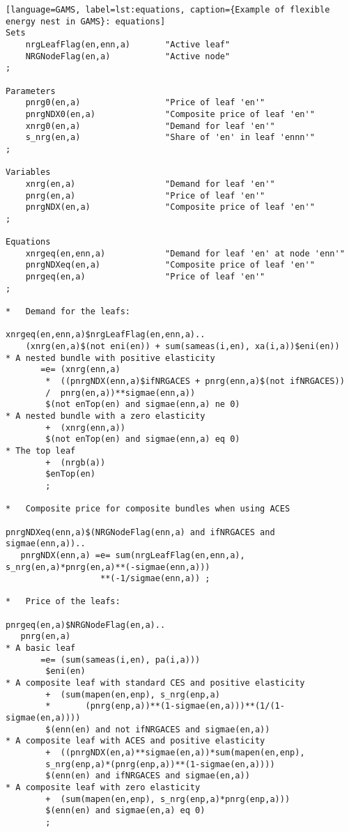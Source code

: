 \begin{lstlisting}[language=GAMS, label=lst:equations, caption={Example of flexible energy nest in GAMS}: equations]
Sets
    nrgLeafFlag(en,enn,a)       "Active leaf"
    NRGNodeFlag(en,a)           "Active node"
;

Parameters
    pnrg0(en,a)                 "Price of leaf 'en'"
    pnrgNDX0(en,a)              "Composite price of leaf 'en'"
    xnrg0(en,a)                 "Demand for leaf 'en'"
    s_nrg(en,a)                 "Share of 'en' in leaf 'ennn'"
;

Variables
    xnrg(en,a)                  "Demand for leaf 'en'"
    pnrg(en,a)                  "Price of leaf 'en'"
    pnrgNDX(en,a)               "Composite price of leaf 'en'"
;

Equations
    xnrgeq(en,enn,a)            "Demand for leaf 'en' at node 'enn'"
    pnrgNDXeq(en,a)             "Composite price of leaf 'en'"
    pnrgeq(en,a)                "Price of leaf 'en'"
;

*   Demand for the leafs:

xnrgeq(en,enn,a)$nrgLeafFlag(en,enn,a)..
    (xnrg(en,a)$(not eni(en)) + sum(sameas(i,en), xa(i,a))$eni(en))
* A nested bundle with positive elasticity
       =e= (xnrg(enn,a)
        *  ((pnrgNDX(enn,a)$ifNRGACES + pnrg(enn,a)$(not ifNRGACES))
        /  pnrg(en,a))**sigmae(enn,a))
        $(not enTop(en) and sigmae(enn,a) ne 0)
* A nested bundle with a zero elasticity
        +  (xnrg(enn,a))
        $(not enTop(en) and sigmae(enn,a) eq 0)
* The top leaf
        +  (nrgb(a))
        $enTop(en)
        ;

*   Composite price for composite bundles when using ACES

pnrgNDXeq(enn,a)$(NRGNodeFlag(enn,a) and ifNRGACES and sigmae(enn,a))..
   pnrgNDX(enn,a) =e= sum(nrgLeafFlag(en,enn,a), s_nrg(en,a)*pnrg(en,a)**(-sigmae(enn,a)))
                   **(-1/sigmae(enn,a)) ;

*   Price of the leafs:

pnrgeq(en,a)$NRGNodeFlag(en,a)..
   pnrg(en,a)
* A basic leaf
       =e= (sum(sameas(i,en), pa(i,a)))
        $eni(en)
* A composite leaf with standard CES and positive elasticity
        +  (sum(mapen(en,enp), s_nrg(enp,a)
        *       (pnrg(enp,a))**(1-sigmae(en,a)))**(1/(1-sigmae(en,a))))
        $(enn(en) and not ifNRGACES and sigmae(en,a))
* A composite leaf with ACES and positive elasticity
        +  ((pnrgNDX(en,a)**sigmae(en,a))*sum(mapen(en,enp),
        s_nrg(enp,a)*(pnrg(enp,a))**(1-sigmae(en,a))))
        $(enn(en) and ifNRGACES and sigmae(en,a))
* A composite leaf with zero elasticity
        +  (sum(mapen(en,enp), s_nrg(enp,a)*pnrg(enp,a)))
        $(enn(en) and sigmae(en,a) eq 0)
        ;
\end{lstlisting}

